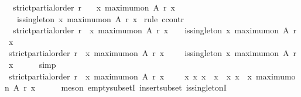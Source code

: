 \begin{isabellebody}
\ \ {\isachardoublequoteopen}strict{\isacharunderscore}partial{\isacharunderscore}order\ r\isanewline
\ \ {\isasymlongrightarrow}\ {\isacharbraceleft}x{\isachardot}\ maximum{\isacharunderscore}on\ A\ r\ x{\isacharbraceright}\ {\isasymnoteq}\ {\isasymemptyset}\ \isanewline
\ \ {\isasymlongrightarrow}\ is{\isacharunderscore}singleton\ {\isacharbraceleft}x{\isachardot}\ maximum{\isacharunderscore}on\ A\ r\ x{\isacharbraceright}{\isachardoublequoteclose}\isanewline
%
\isadelimproof
%
\endisadelimproof
%
\isatagproof
{}\isamarkupfalse%
\ {\isacharparenleft}rule\ ccontr{\isacharparenright}\isanewline
\ \ \isamarkupfalse%
\ {\isachardoublequoteopen}{\isasymnot}\ {\isacharparenleft}strict{\isacharunderscore}partial{\isacharunderscore}order\ r\ {\isasymlongrightarrow}\ {\isacharbraceleft}x{\isachardot}\ maximum{\isacharunderscore}on\ A\ r\ x{\isacharbraceright}\ {\isasymnoteq}\ {\isasymemptyset}\ {\isasymlongrightarrow}\ is{\isacharunderscore}singleton\ {\isacharbraceleft}x{\isachardot}\ maximum{\isacharunderscore}on\ A\ r\ x{\isacharbraceright}{\isacharparenright}{\isachardoublequoteclose}\isanewline
\ \ \isamarkupfalse%
\ \isamarkupfalse%
\ {\isachardoublequoteopen}strict{\isacharunderscore}partial{\isacharunderscore}order\ r\ {\isasymlongrightarrow}\ {\isacharbraceleft}x{\isachardot}\ maximum{\isacharunderscore}on\ A\ r\ x{\isacharbraceright}\ {\isasymnoteq}\ {\isasymemptyset}\ {\isasymlongrightarrow}\ {\isasymnot}\ is{\isacharunderscore}singleton\ {\isacharbraceleft}x{\isachardot}\ maximum{\isacharunderscore}on\ A\ r\ x{\isacharbraceright}{\isachardoublequoteclose}\isanewline
\ \ \ \ \isamarkupfalse%
\ simp\isanewline
\ \ \isamarkupfalse%
\ \isamarkupfalse%
\ {\isachardoublequoteopen}strict{\isacharunderscore}partial{\isacharunderscore}order\ r\ {\isasymlongrightarrow}\ {\isacharbraceleft}x{\isachardot}\ maximum{\isacharunderscore}on\ A\ r\ x{\isacharbraceright}\ {\isasymnoteq}\ {\isasymemptyset}\ {\isasymlongrightarrow}\ {\isacharparenleft}{\isasymexists}\ x{}\ x{}{\isachardot}\ x{}\ {\isasymnoteq}\ x{}\ {\isasymand}\ {\isacharbraceleft}x{}{\isacharcomma}\ x{}{\isacharbraceright}\ {\isasymsubseteq}\ {\isacharbraceleft}x{\isachardot}\ maximum{\isacharunderscore}on\ A\ r\ x{\isacharbraceright}{\isacharparenright}{\isachardoublequoteclose}\isanewline
\ \ \ \ \isamarkupfalse%
\ {\isacharparenleft}meson\ empty{\isacharunderscore}subsetI\ insert{\isacharunderscore}subset\ is{\isacharunderscore}singletonI{\isacharprime}{\isacharparenright}\isanewline

\end{isabellebody}

